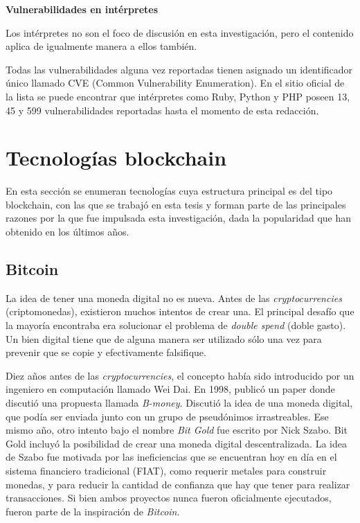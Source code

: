 \textbf{Vulnerabilidades en intérpretes}

Los intérpretes no son el foco de discusión en esta investigación, pero el contenido aplica de igualmente manera a ellos también.

Todas las vulnerabilidades alguna vez reportadas tienen asignado un identificador único llamado CVE (Common Vulnerability Enumeration). En el sitio oficial de la lista se puede encontrar que intérpretes como Ruby\cite{rubyvulns}, Python\cite{pythonvulns} y PHP\cite{phpvulns} poseen 13, 45 y 599 vulnerabilidades reportadas hasta el momento de esta redacción.


\section{Tecnologías blockchain}
En esta sección se enumeran tecnologías cuya estructura principal es del tipo blockchain, con las que se trabajó en esta tesis y forman parte de las principales razones por la que fue impulsada esta investigación, dada la popularidad que han obtenido en los últimos años.


\subsection{Bitcoin}
La idea de tener una moneda digital no es nueva. Antes de las \textit{cryptocurrencies} (criptomonedas), existieron muchos intentos de crear una. El principal desafío que la mayoría encontraba era solucionar el problema de \textit{double spend} (doble gasto). Un bien digital tiene que de alguna manera ser utilizado sólo una vez para prevenir que se copie y efectivamente falsifique.\cite{briefhistorycryptoledger}

Diez años antes de las \textit{cryptocurrencies}, el concepto había sido introducido por un ingeniero en computación llamado Wei Dai. En 1998, publicó un paper donde discutió una propuesta llamada \textit{B-money}. Discutió la idea de una moneda digital, que podía ser enviada junto con un grupo de pseudónimos irrastreables. Ese mismo año, otro intento bajo el nombre \textit{Bit Gold} fue escrito por Nick Szabo. Bit Gold incluyó la posibilidad de crear una moneda digital descentralizada. La idea de Szabo fue motivada por las ineficiencias que se encuentran hoy en día en el sistema financiero tradicional (FIAT), como requerir metales para construir monedas, y para reducir la cantidad de confianza que hay que tener para realizar transacciones. Si bien ambos proyectos nunca fueron oficialmente ejecutados, fueron parte de la inspiración de \textit{Bitcoin}\cite{narayanan2016bitcoin}.

